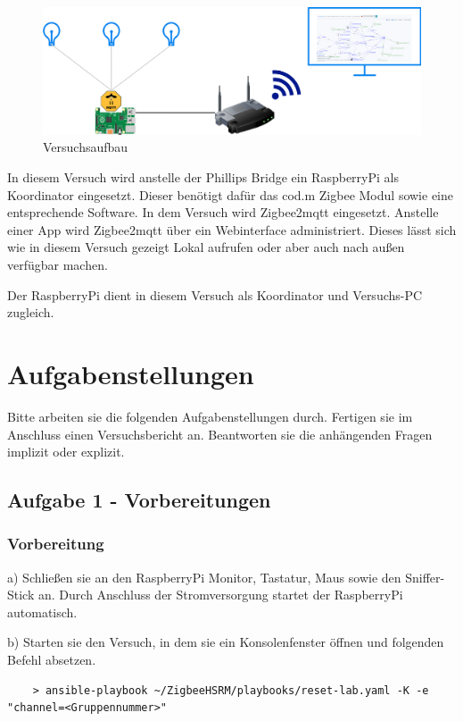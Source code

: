 \begin{figure}[H]
    \centering
    \includegraphics[width=1\textwidth]{media/zbz2m.png}
    \caption{Versuchsaufbau}
\end{figure}

In diesem Versuch wird anstelle der Phillips Bridge ein RaspberryPi als Koordinator eingesetzt. Dieser benötigt dafür das cod.m Zigbee Modul sowie eine entsprechende
Software. In dem Versuch wird Zigbee2mqtt eingesetzt. Anstelle einer App wird Zigbee2mqtt über ein Webinterface administriert. Dieses lässt sich wie in diesem Versuch gezeigt Lokal 
aufrufen oder aber auch nach außen verfügbar machen. 

Der RaspberryPi dient in diesem Versuch als Koordinator und Versuchs-PC zugleich. 

\section{Aufgabenstellungen}

Bitte arbeiten sie die folgenden Aufgabenstellungen durch. Fertigen sie im Anschluss einen Versuchsbericht an. Beantworten sie die anhängenden Fragen
implizit oder explizit.

\subsection{Aufgabe 1 - Vorbereitungen}

\subsubsection{Vorbereitung}
a) Schließen sie an den RaspberryPi Monitor, Tastatur, Maus sowie den Sniffer-Stick an. Durch Anschluss der
Stromversorgung startet der RaspberryPi automatisch. 

b) Starten sie den Versuch, in dem sie ein Konsolenfenster öffnen und folgenden Befehl absetzen.

\begin{lstlisting}
    > ansible-playbook ~/ZigbeeHSRM/playbooks/reset-lab.yaml -K -e "channel=<Gruppennummer>"
\end{lstlisting}

